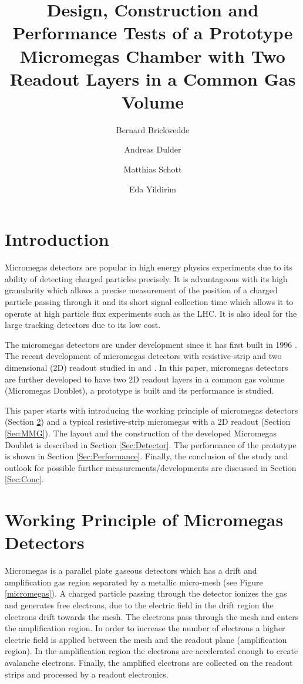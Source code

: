 \documentclass[a4paper,11pt]{article}
\title{\boldmath Design, Construction and Performance Tests of a Prototype Micromegas Chamber with Two Readout Layers in a Common Gas Volume}
\author[a]{Bernard Brickwedde}
\author[a]{Andreas Dulder}
\author[a]{Matthias Schott}
\author[a]{Eda Yildirim}
\affiliation[a]{Johannes Gutenberg-University, Mainz, Germany}
\begin{document}
\maketitle
\flushbottom
\newpage

\section{Introduction}
\label{Sec:Intro}
Micromegas detectors are popular in high energy physics experiments due to its ability of detecting charged particles precisely. It is advantageous with its high granularity which allows a precise measurement of the position of a charged particle passing through it and its short signal collection time which allows it to operate at high particle flux experiments such as the LHC. It is also ideal for the large tracking detectors due to its low cost.

The micromegas detectors are under development since it has first built in 1996 \cite{Giomataris:1995fq}. The recent development of micromegas detectors with resistive-strip and two dimensional (2D) readout studied in \cite{Byszewski:2012zz} and \cite{Lin2014281}. In this paper, micromegas detectors are further developed to have two 2D readout layers in a common gas volume (Micromegas Doublet), a prototype is built and its performance is studied. 

This paper starts with introducing the working principle of micromegas detectors (Section \ref{Sec:Principle}) and a typical resistive-strip micromegas with a 2D readout (Section \ref{Sec:MMG}). The layout and the construction of the developed Micromegas Doublet is described in Section \ref{Sec:Detector}. The performance of the prototype is shown in Section \ref{Sec:Performance}. Finally, the conclusion of the study and outlook for possible further measurements/developments are discussed in Section \ref{Sec:Conc}.


\section{Working Principle of Micromegas Detectors}
\label{Sec:Principle}
Micromegas is a parallel plate gaseous detectors which has a drift and amplification gas region separated by a metallic micro-mesh (see Figure \ref{micromegas}). A charged particle passing through the detector ionizes the gas and generates free electrons, due to the electric field in the drift region the electrons drift towards the mesh. The electrons pass through the mesh and enters the amplification region. In order to increase the number of electrons a higher electric field is applied between the mesh and the readout plane (amplification region). In the amplification region the electrons are accelerated enough to create avalanche electrons. Finally, the amplified electrons are collected on the readout strips and processed by a readout electronics.  
\end{document}
